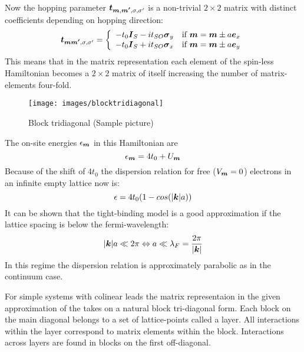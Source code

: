Now the hopping parameter $\boldsymbol{t}_{\boldsymbol{m},\boldsymbol{m'},\sigma,\sigma '}$ is a non-trivial $2 \times 2$ matrix with distinct coefficients depending on hopping direction:
\begin{align}
	\boldsymbol{t}_{\boldsymbol{m}\boldsymbol{m'},\sigma,\sigma '} = \left\{ \begin{array}[c]{cl} -t_0\boldsymbol{I}_S - i t_{SO} \boldsymbol{\sigma}_y & \text{if } \boldsymbol{m} = \boldsymbol{m} \pm a \boldsymbol{e}_{x} \\
		-t_0\boldsymbol{I}_S + i t_{SO} \boldsymbol{\sigma}_x & \text{if } \boldsymbol{m} = \boldsymbol{m} \pm a \boldsymbol{e}_{y} \end{array} \right.
	\label{eqn:tsohopping}
\end{align}
This means that in the matrix representation each element of the spin-less Hamiltonian becomes a $2 \times 2$ matrix of itself increasing the number of matrix-elements four-fold.
\begin{figure}[h!]
\centering
\texttt{[image: images/blocktridiagonal]}
\caption{Block tridiagonal (Sample picture)}
\label{fig:blocktridiagonal}
\end{figure}
The on-site energies $\epsilon_{\boldsymbol{m}}$ in this Hamiltonian are
\begin{equation}
\epsilon_{\boldsymbol{m}} = 4t_0 + U_{\boldsymbol{m}} 
\end{equation}
Because of the shift of $4 t_0$ the dispersion relation for free ($V_{\boldsymbol{m}}=0$) electrons in an infinite empty lattice now is:
\begin{equation}
\epsilon = 4t_0(1-cos(\lvert\boldsymbol{k}\rvert a))
\end{equation}
It can be shown that the tight-binding model is a good approximation if the lattice spacing is below the fermi-wavelength:
\begin{equation}
\lvert\boldsymbol{k}\rvert a \ll  2\pi \Leftrightarrow a \ll \lambda_F = \frac{2\pi}{\lvert\boldsymbol{k}\rvert}
\end{equation}
In this regime the dispersion relation is approximately parabolic as in the continuum case.\cite{Metalidis2007Thesis}

For simple systems with colinear leads the matrix representaion in the given approximation of the \hamil{} takes on a natural block tri-diagonal form. Each block on the main diagonal belongs to a set of lattice-points called a layer. All interactions within the layer correspond to matrix elements within the block. Interactions across layers are found in blocks on the first off-diagonal\cite{AnLunNik2008}.
